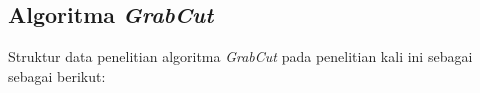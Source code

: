 


\subsection{Algoritma \emph{GrabCut}}
Struktur data penelitian algoritma \emph{GrabCut} pada penelitian kali ini sebagai 
sebagai berikut: 

